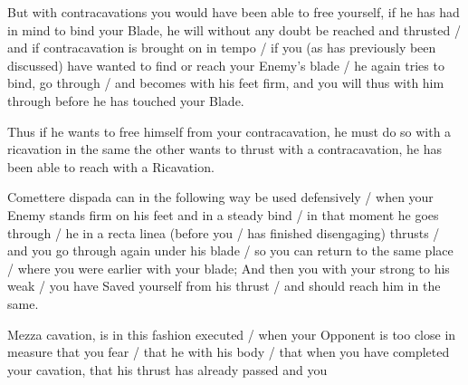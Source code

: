
But with contracavations you would have been able to free yourself, if
he has had in mind to bind your Blade, he will without any doubt be
reached and thrusted / and if contracavation is brought on in tempo /
if you (as has previously been discussed) have wanted to find or reach
your Enemy's blade / he again tries to bind, go through / and becomes
with his feet firm, and you will thus with him through before he has
touched your Blade.


Thus if he wants to free himself from your contracavation, he must do
so with a ricavation in the same the other wants to thrust with a
contracavation, he has been able to reach with a Ricavation.


Comettere dispada can in the following way be used defensively / when
your Enemy stands firm on his feet and in a steady bind / in that
moment he goes through / he in a recta linea (before you / has
finished disengaging) thrusts / and you go through again under his blade /
so you can return to the same place / where you were earlier with your
blade; And then you with your strong to his weak / you have Saved
yourself from his thrust / and should reach him in the same.


Mezza cavation, is in this fashion executed / when your Opponent is
too close in measure that you fear / that he
with his body / that when you have completed your cavation, that his
thrust has already passed and you
